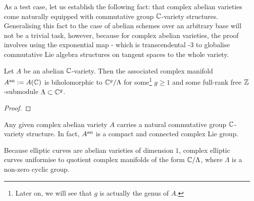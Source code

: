             As a test case, let us establish the following fact: that complex abelian varieties come naturally equipped with commutative group $\mathbb{C}$-variety structures. Generalising this fact to the case of abelian schemes over an arbitrary base will not be a trivial task, however, because for complex abelian varieties, the proof involves using the exponential map - which is transcendental -3 to globalise commutative Lie algebra structures on tangent spaces to the whole variety. 
            \begin{proposition} \label{prop: uniformisations_of_complex_abelian_varieties}
                Let $A$ be an abelian $\mathbb{C}$-variety. Then the associated complex manifold $A^{\mathrm{an}} := A(\mathbb{C})$ is biholomorphic to $\mathbb{C}^g/\Lambda$ for some\footnote{Later on, we will see that $g$ is actually the genus of $A$.} $g \geq 1$ and some full-rank free $\mathbb{Z}$-submodule $\Lambda \subset \mathbb{C}^g$.
            \end{proposition}
                \begin{proof}
                    
                \end{proof}
            \begin{corollary} \label{coro: complex_abelian_varieties_are_complex_lie_groups}
                Any given complex abelian variety $A$ carries a natural commutative group $\mathbb{C}$-variety structure. In fact, $A^{\mathrm{an}}$ is a compact and connected complex Lie group.
            \end{corollary}
            \begin{example}
                Because elliptic curves are abelian varieties of dimension $1$, complex elliptic curves uniformise to quotient complex manifolds of the form $\mathbb{C}/\Lambda$, where $\Lambda$ is a non-zero cyclic group.
            \end{example}
